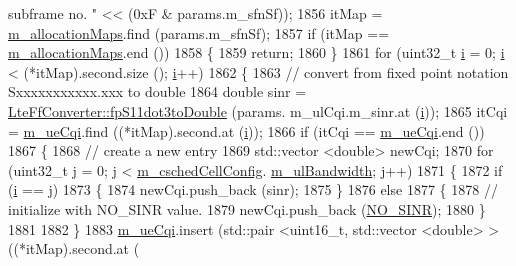 \begin{DoxyCode}
{       subframe no. "} << (0xF & params.m\_sfnSf));
1856         itMap = \hyperlink{classns3_1_1FdMtFfMacScheduler_a95332c7dd2b82f65f37ee9bff70558e6}{m\_allocationMaps}.find (params.m\_sfnSf);
1857         \textcolor{keywordflow}{if} (itMap == \hyperlink{classns3_1_1FdMtFfMacScheduler_a95332c7dd2b82f65f37ee9bff70558e6}{m\_allocationMaps}.end ())
1858           \{
1859             \textcolor{keywordflow}{return};
1860           \}
1861         \textcolor{keywordflow}{for} (uint32\_t \hyperlink{bernuolliDistribution_8m_a6f6ccfcf58b31cb6412107d9d5281426}{i} = 0; \hyperlink{bernuolliDistribution_8m_a6f6ccfcf58b31cb6412107d9d5281426}{i} < (*itMap).second.size (); \hyperlink{bernuolliDistribution_8m_a6f6ccfcf58b31cb6412107d9d5281426}{i}++)
1862           \{
1863             \textcolor{comment}{// convert from fixed point notation Sxxxxxxxxxxx.xxx to double}
1864             \textcolor{keywordtype}{double} sinr = \hyperlink{classns3_1_1LteFfConverter_aa5d8c2a8f988dbd63da91818c18666eb}{LteFfConverter::fpS11dot3toDouble} (params.
      m\_ulCqi.m\_sinr.at (\hyperlink{bernuolliDistribution_8m_a6f6ccfcf58b31cb6412107d9d5281426}{i}));
1865             itCqi = \hyperlink{classns3_1_1FdMtFfMacScheduler_a5111c284868ab2a71c868fff681dbc0b}{m\_ueCqi}.find ((*itMap).second.at (\hyperlink{bernuolliDistribution_8m_a6f6ccfcf58b31cb6412107d9d5281426}{i}));
1866             \textcolor{keywordflow}{if} (itCqi == \hyperlink{classns3_1_1FdMtFfMacScheduler_a5111c284868ab2a71c868fff681dbc0b}{m\_ueCqi}.end ())
1867               \{
1868                 \textcolor{comment}{// create a new entry}
1869                 std::vector <double> newCqi;
1870                 \textcolor{keywordflow}{for} (uint32\_t j = 0; j < \hyperlink{classns3_1_1FdMtFfMacScheduler_a9f2e3c6bfae8bfc266a84f64e5937ac8}{m\_cschedCellConfig}.
      \hyperlink{structns3_1_1FfMacCschedSapProvider_1_1CschedCellConfigReqParameters_a5ab5b102878e6e7e7727a14af4a64d2f}{m\_ulBandwidth}; j++)
1871                   \{
1872                     \textcolor{keywordflow}{if} (\hyperlink{bernuolliDistribution_8m_a6f6ccfcf58b31cb6412107d9d5281426}{i} == j)
1873                       \{
1874                         newCqi.push\_back (sinr);
1875                       \}
1876                     \textcolor{keywordflow}{else}
1877                       \{
1878                         \textcolor{comment}{// initialize with NO\_SINR value.}
1879                         newCqi.push\_back (\hyperlink{cqa-ff-mac-scheduler_8h_a520d71777be043568160c783a9c65fd5}{NO\_SINR});
1880                       \}
1881 
1882                   \}
1883                 \hyperlink{classns3_1_1FdMtFfMacScheduler_a5111c284868ab2a71c868fff681dbc0b}{m\_ueCqi}.insert (std::pair <uint16\_t, std::vector <double> > ((*itMap).second.at (

\end{DoxyCode}
